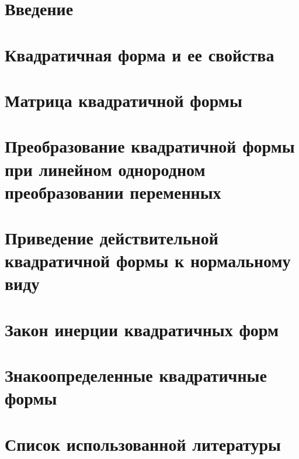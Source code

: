 \documentclass[a4paper,14pt]{extreport}
\author{Sharov Alex}
\begin{document}
 
\setcounter{tocdepth}{1}



\tableofcontents{}



\section{Введение}

\section{Квадратичная форма и ее свойства}

\section{Матрица квадратичной формы}

\section{Преобразование квадратичной формы при линейном однородном‭ ‬преобразовании переменных}

\section{Приведение действительной квадратичной формы к нормальному‭ ‬виду}

\section{Закон инерции квадратичных форм}

\section{Знакоопределенные квадратичные формы}

\section{Список‭ ‬использованной литературы}
\end{document}

